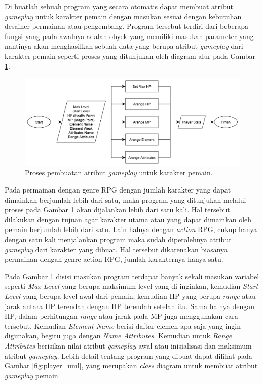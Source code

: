Di buatlah sebuah program yang secara otomatis dapat membuat atribut \textit{gameplay} untuk karakter pemain dengan masukan sesuai dengan kebutuhan desainer permainan atau pengembang. Program tersebut terdiri dari beberapa fungsi yang pada awalnya adalah obyek yang memiliki masukan parameter yang nantinya akan menghasilkan sebuah data yang berupa atribut \textit{gameplay} dari karakter pemain seperti proses yang ditunjukan oleh diagram alur pada Gambar \ref{fig:player_stats_generator}.

\begin{figure} [!h] \centering
	\includegraphics[scale=0.08]{img/player_stats_generator.png}
	\caption{Proses pembuatan atribut \textit{gameplay} untuk karakter pemain.}
	\label{fig:player_stats_generator}
\end{figure}

Pada permainan dengan genre RPG dengan jumlah karakter yang dapat dimainkan berjumlah lebih dari satu, maka program yang ditunjukan melalui proses pada Gambar \ref{fig:player_stats_generator} akan dijalankan lebih dari satu kali. Hal tersebut dilakukan dengan tujuan agar karakter utama atau yang dapat dimainkan oleh pemain berjumlah lebih dari satu. Lain halnya dengan \textit{action} RPG, cukup hanya dengan satu kali menjalankan program maka sudah diperolehnya atribut \textit{gameplay} dari karakter yang dibuat. Hal tersebut dikarenakan biasanya permainan dengan genre action RPG, jumlah karakternya hanya satu.
\vspace{1ex}

Pada Gambar \ref{fig:player_stats_generator} disisi masukan program terdapat banyak sekali masukan variabel seperti \textit{Max Level} yang berupa maksimum level yang di inginkan, kemudian \textit{Start Level} yang berupa level awal dari pemain, kemudian HP yang berupa \textit{range} atau jarak antara HP terendah dengan HP terendah setelah itu. Sama halnya dengan HP, dalam perhitungan \textit{range} atau jarak pada MP juga menggunakan cara tersebut. Kemudian \textit{Element Name} berisi daftar elemen apa saja yang ingin digunakan, begitu juga dengan \textit{Name Attributes}. Kemudian untuk \textit{Range Attributes} berisikan nilai atribut \textit{gameplay} awal atau inisialisasi dan maksimum atribut \textit{gameplay}. Lebih detail tentang program yang dibuat dapat dilihat pada Gambar \ref{fig:player_uml}, yang merupakan \textit{class} diagram untuk membuat atribut \textit{gameplay} pemain.
\vspace{1ex}

